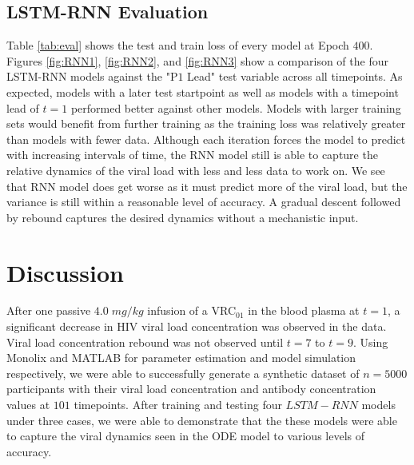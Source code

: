 \documentclass[fleqn,10pt]{wlscirep}
\begin{document}
\subsection*{LSTM-RNN Evaluation}

Table \ref{tab:eval} shows the test and train loss of every model at Epoch $400$. Figures \ref{fig:RNN1}, \ref{fig:RNN2}, and \ref{fig:RNN3} show a comparison of the four LSTM-RNN models against the "P$1$ Lead" test variable across all timepoints. As expected, models with a later test startpoint as well as models with a timepoint lead of $t=1$ performed better against other models. Models with larger training sets would benefit from further training as the training loss was relatively greater than models with fewer data. Although each iteration forces the model to predict with increasing intervals of time, the RNN model still is able to capture the relative dynamics of the viral load with less and less data to work on. We see that RNN model does get worse as it must predict more of the viral load, but the variance is still within a reasonable level of accuracy. A gradual descent followed by rebound captures the desired dynamics without a mechanistic input.




\section*{Discussion}

After one passive $4.0 \; mg/kg$ infusion of a VRC$_{01}$ in the blood plasma at $t=1$, a significant decrease in HIV viral load concentration was observed in the data. Viral load concentration rebound was not observed until $t=7$ to $t=9$. Using Monolix and MATLAB for parameter estimation and model simulation respectively, we were able to successfully generate a synthetic dataset of $n=5000$ participants with their viral load concentration and antibody concentration values at $101$ timepoints. After training and testing four $LSTM-RNN$ models under three cases, we were able to demonstrate that the these models were able to capture the viral dynamics seen in the ODE model to various levels of accuracy. 
\end{document}
